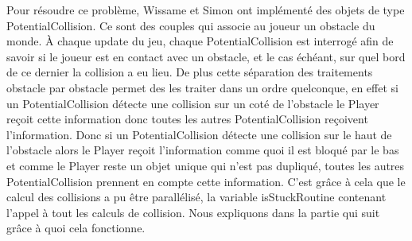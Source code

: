 
Pour résoudre ce problème, Wissame et Simon ont implémenté des objets de type PotentialCollision.
Ce sont des couples qui associe au joueur un obstacle du monde. À chaque update du jeu, chaque PotentialCollision est interrogé afin de savoir si le joueur est en contact avec un obstacle, et le cas échéant, sur quel bord de ce dernier la collision a eu lieu.
\ml
De plus cette séparation des traitements obstacle par obstacle permet des les traiter dans un ordre quelconque, en effet si un PotentialCollision détecte une collision sur un coté de l'obstacle le Player reçoit cette information donc toutes les autres PotentialCollision reçoivent l'information. 
\ml
Donc si un PotentialCollision détecte une collision sur le haut de l'obstacle alors le Player reçoit l'information comme quoi il est bloqué par le bas et comme le Player reste un objet unique qui n'est pas dupliqué, toutes les autres PotentialCollision prennent en compte cette information.
\ml
C'est grâce à cela que le calcul des collisions a pu être parallélisé, la variable isStuckRoutine contenant l'appel à tout les calculs de collision. Nous expliquons dans la partie qui suit grâce à quoi cela fonctionne.